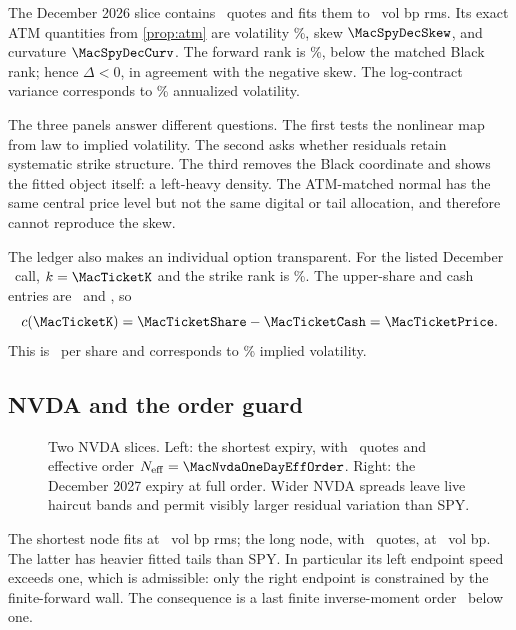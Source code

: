 The December 2026 slice contains \MacSpyDecNQuotes\ quotes and fits them to
\MacSpyDecRmsBp\ vol bp rms.  Its exact ATM quantities from
\cref{prop:atm} are volatility \MacSpyDecAtmVolPct\%, skew
$\MacSpyDecSkew$, and curvature $\MacSpyDecCurv$.  The forward rank is
\MacSpyDecForwardRankPct\%, below the matched Black rank; hence
$\Delta<0$, in agreement with the negative skew.  The log-contract variance
corresponds to \MacSpyDecVarSwapPct\% annualized volatility.

The three panels answer different questions.  The first tests the nonlinear
map from law to implied volatility.  The second asks whether residuals retain
systematic strike structure.  The third removes the Black coordinate and
shows the fitted object itself: a left-heavy density.  The ATM-matched normal
has the same central price level but not the same digital or tail allocation,
and therefore cannot reproduce the skew.

The ledger also makes an individual option transparent.  For the listed
December \MacTicketStrike\ call, $k=\MacTicketK$ and the strike rank is
\MacTicketRankPct\%.  The upper-share and cash entries are
\MacTicketShare\ and \MacTicketCash, so
\[
c(\MacTicketK)=\MacTicketShare-\MacTicketCash=\MacTicketPrice.
\]
This is \MacTicketDollarPrice\ per share and corresponds to
\MacTicketIvPct\% implied volatility.

\subsection{NVDA and the order guard}

\begin{figure}[htbp]
\centering
{}
\caption{Two NVDA slices.  Left: the shortest expiry, with
\MacNvdaOneDayNQuotes\ quotes and effective order
$N_{\rm eff}=\MacNvdaOneDayEffOrder$.  Right: the December 2027 expiry at
full order.  Wider NVDA spreads leave live haircut bands and permit visibly
larger residual variation than SPY.}
\label{fig:nvda_nodes}
\end{figure}

The shortest node fits at \MacNvdaOneDayRmsBp\ vol bp rms; the long node, with
\MacNvdaLongNQuotes\ quotes, at \MacNvdaLongRmsBp\ vol bp.  The latter has
heavier fitted tails than SPY.  In particular its left endpoint speed exceeds
one, which is admissible: only the right endpoint is constrained by the
finite-forward wall.  The consequence is a last finite inverse-moment order
\MacNvdaLongMomentLeft\ below one.

